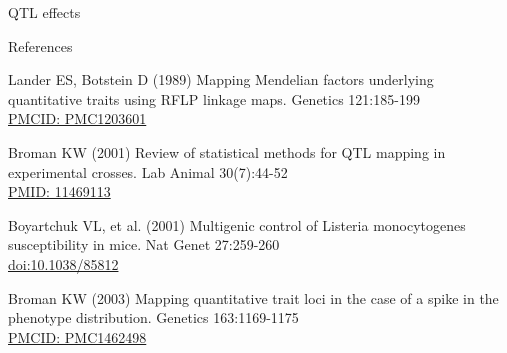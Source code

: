 \documentclass[aspectratio=169,12pt,t]{beamer}
\begin{document}
\begin{frame}[c]{QTL effects}
\end{frame}






\begin{frame}{References}
\vspace{-7mm}

  \bbi

\item Lander ES, Botstein D (1989) Mapping Mendelian factors
  underlying quantitative traits using RFLP linkage maps. Genetics
  121:185-199 \\
  \href{https://www.ncbi.nlm.nih.gov/pmc/articles/PMC1203601}{\footnotesize
    PMCID: PMC1203601}

\item Broman KW (2001) Review of statistical methods for QTL mapping
  in experimental crosses. Lab Animal 30(7):44-52 \\
  \href{https://www.ncbi.nlm.nih.gov/pubmed/11469113}{\footnotesize
    PMID: 11469113}

\item Boyartchuk VL, et al. (2001) Multigenic control of Listeria monocytogenes
  susceptibility in mice. Nat Genet 27:259-260 \\
  \href{https://doi.org/10.1038/85812}{\footnotesize doi:10.1038/85812}

\item Broman KW (2003) Mapping quantitative trait loci in the case
  of a spike in the phenotype distribution. Genetics 163:1169-1175 \\
  \href{https://www.ncbi.nlm.nih.gov/pmc/articles/PMC1462498}{\footnotesize
    PMCID: PMC1462498}

\ei


\end{frame}
\end{document}
